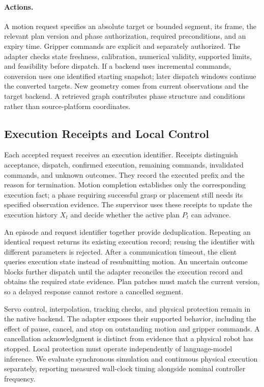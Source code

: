 \paragraph{Actions.}
A motion request specifies an absolute target or bounded segment, its frame, the relevant plan version and phase authorization, required preconditions, and an expiry time. Gripper commands are explicit and separately authorized. The adapter checks state freshness, calibration, numerical validity, supported limits, and feasibility before dispatch. If a backend uses incremental commands, conversion uses one identified starting snapshot; later dispatch windows continue the converted targets. New geometry comes from current observations and the target backend. A retrieved graph contributes phase structure and conditions rather than source-platform coordinates.

\subsection{Execution Receipts and Local Control}

Each accepted request receives an execution identifier. Receipts distinguish acceptance, dispatch, confirmed execution, remaining commands, invalidated commands, and unknown outcomes. They record the executed prefix and the reason for termination. Motion completion establishes only the corresponding execution fact; a phase requiring successful grasp or placement still needs its specified observation evidence. The supervisor uses these receipts to update the execution history $X_t$ and decide whether the active plan $P_t$ can advance.

An episode and request identifier together provide deduplication. Repeating an identical request returns its existing execution record; reusing the identifier with different parameters is rejected. After a communication timeout, the client queries execution state instead of resubmitting motion. An uncertain outcome blocks further dispatch until the adapter reconciles the execution record and obtains the required state evidence. Plan patches must match the current version, so a delayed response cannot restore a cancelled segment.

Servo control, interpolation, tracking checks, and physical protection remain in the native backend. The adapter exposes their supported behavior, including the effect of pause, cancel, and stop on outstanding motion and gripper commands. A cancellation acknowledgment is distinct from evidence that a physical robot has stopped. Local protection must operate independently of language-model inference. We evaluate synchronous simulation and continuous physical execution separately, reporting measured wall-clock timing alongside nominal controller frequency.

